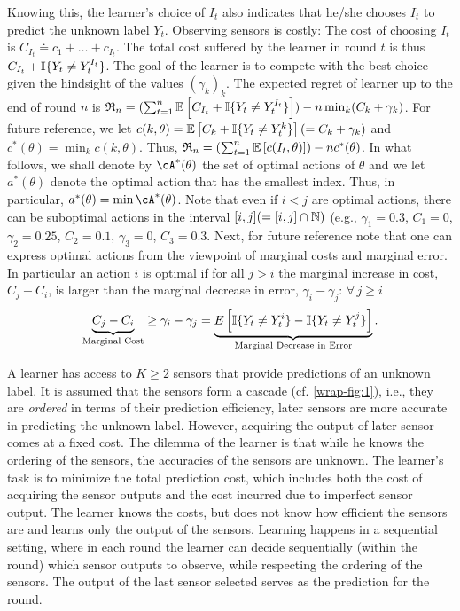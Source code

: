 Knowing this, the learner's choice of $I_t$ also indicates that he/she chooses $I_t$ to predict the unknown label $Y_t$.
Observing sensors is costly: The cost of choosing $I_t$ is $C_{I_t} \doteq c_1 + \dots + c_{I_t}$.
The total cost suffered by the learner in round $t$ is thus $C_{I_t} + \mathbb{I}\{Y_t \ne Y_t^{I_t}\}$.
The goal of the learner is to compete with the best choice given the hindsight of the values $(\gamma_k)_k$.
The expected regret of learner up to the end of round $n$ is 
$\mathfrak{R}_n =( \sum_{t=1}^n \mathbb{E}\left[ C_{I_t} +\mathbb{I}\{Y_t \ne Y_t^{I_t} \}\right] )- n \min_k (C_k + \gamma_k)$.
For future reference, we let $c(k,\theta) = \mathbb{E}\left[ C_{k} +\mathbb{I}\{Y_t \ne Y_t^{k} \}\right]  (= C_k + \gamma_k)$ and $c^*(\theta) = \min_k c(k,\theta)$. Thus, $\mathfrak{R}_n =( \sum_{t=1}^n \mathbb{E}\left[ c(I_t,\theta) \right]) - n c^*(\theta)$.
In what follows, we shall denote by $\cA^*(\theta)$ the set of optimal actions of $\theta$
and we let $a^*(\theta)$ denote the optimal action that has the smallest index. Thus,
in particular, $a^*(\theta) = \min \cA^*(\theta)$. 
Note that even if $i<j$ are optimal actions, there can be suboptimal actions in the interval $[i,j] (=[i,j]\cap \mathbb{N})$
(e.g., $\gamma_1=0.3$, $C_1=0$, $\gamma_2=0.25$, $C_2=0.1$, $\gamma_3=0$, $C_3=0.3$. 
Next, for future reference note that one 
can express optimal actions from the viewpoint of marginal costs and marginal error. 
In particular an action $i$ is optimal if for all $j > i$ the marginal increase in cost, $C_j - C_i$, 
is larger than the marginal decrease in error, $\gamma_i - \gamma_j$: $ \forall \, j \geq i\,$
\begin{equation} \label{eqn:interp_opt}
\underbrace{C_j - C_i}_{\text{Marginal Cost}} \geq \gamma_i - \gamma_j = \underbrace{ E \left [ \mathbb{I}\{Y_t \ne Y_t^i\} - \mathbb{I}\{Y_t \ne Y_t^j\} \right ]}_{\text{Marginal Decrease in Error}}.
\end{equation}


A learner has access to $K\geq 2$ sensors that provide predictions
of an unknown label. 
 It is assumed that the sensors form a cascade (cf. \cref{wrap-fig:1}),
i.e., they are  \emph{ordered} in terms of their prediction efficiency,
later sensors are more accurate in predicting the unknown label.
However, acquiring the output of later sensor comes at a fixed cost.
The dilemma of the learner is that while he knows the ordering of the sensors,
the accuracies of the sensors are unknown.
The learner's task is to minimize the total prediction cost, which includes
both the cost of acquiring the sensor outputs and the cost incurred due to imperfect
sensor output.
The learner knows the costs, but does not know how efficient the sensors are
and learns only the output of the sensors.
Learning happens in a sequential setting, where in each round the learner can decide
sequentially (within the round) which sensor outputs to observe,
while respecting the ordering of the sensors.
The output of the last sensor selected serves as the prediction for the round.

